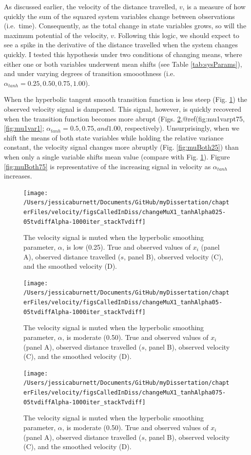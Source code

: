 \documentclass[12pt,twoside,openany]{reedthesis}
\begin{document}
As discussed earlier, the velocity of the distance travelled, \(v\), is a measure of how quickly the sum of the squared system variables change between observations (i.e.~time). Consequently, as the total change in state variables grows, so will the maximum potential of the velocity, \(v\). Following this logic, we should expect to see a spike in the derivative of the distance travelled when the system changes quickly. I tested this hypothesis under two conditions of changing means, where either one or both variables underwent mean shifts (see Table \ref{tab:sysParams}), and under varying degrees of transition smooothness (i.e.~\(\alpha_{tanh}={0.25, 0.50, 0.75, 1.00}\)).

When the hyperbolic tangent smooth transition function is less steep (Fig. \ref{fig:mu1varpt25}) the observed velocity signal is dampened. This signal, however, is quickly recovered when the transition function becomes more abrupt (Figs. \ref{fig:mu1varpt5},@ref(fig:mu1varpt75,\ref{fig:mu1var1}; \(\alpha_{tanh}=0.5, 0.75, and 1.00\), respectively). Unsurprisingly, when we shift the means of both state variables while holding the relative variance constant, the velocity signal changes more abruptly (Fig. \ref{fig:muBoth25}) than when only a single variable shifts mean value (compare with Fig. \ref{fig:mu1varpt25}). Figure \ref{fig:muBoth75} is representative of the increasing signal in velocity as \(\alpha_{tanh}\) increases.
\begin{figure}
\texttt{[image: /Users/jessicaburnett/Documents/GitHub/myDissertation/chapterFiles/velocity/figsCalledInDiss/changeMuX1\_tanhAlpha025-05tvdiffAlpha-1000iter\_stackTvdiff]} \caption{The velocity signal is muted when the  hyperbolic smoothing parameter, $\alpha$, is low (0.25). True and observed values of $x_i$ (panel A), observed distance travelled ($s$, panel B), observed velocity (C), and the smoothed velocity (D). }\label{fig:mu1varpt25}
\end{figure}
\begin{figure}
\texttt{[image: /Users/jessicaburnett/Documents/GitHub/myDissertation/chapterFiles/velocity/figsCalledInDiss/changeMuX1\_tanhAlpha05-05tvdiffAlpha-1000iter\_stackTvdiff]} \caption{The velocity signal is muted when the  hyperbolic smoothing parameter, $\alpha$, is moderate (0.50). True and observed values of $x_i$ (panel A), observed distance travelled ($s$, panel B), observed velocity (C), and the smoothed velocity (D). }\label{fig:mu1varpt5}
\end{figure}
\begin{figure}
\texttt{[image: /Users/jessicaburnett/Documents/GitHub/myDissertation/chapterFiles/velocity/figsCalledInDiss/changeMuX1\_tanhAlpha075-05tvdiffAlpha-1000iter\_stackTvdiff]} \caption{The velocity signal is muted when the  hyperbolic smoothing parameter, $\alpha$, is moderate (0.50). True and observed values of $x_i$ (panel A), observed distance travelled ($s$, panel B), observed velocity (C), and the smoothed velocity (D). }\label{fig:mu1varpt75}
\end{figure}
\end{document}

